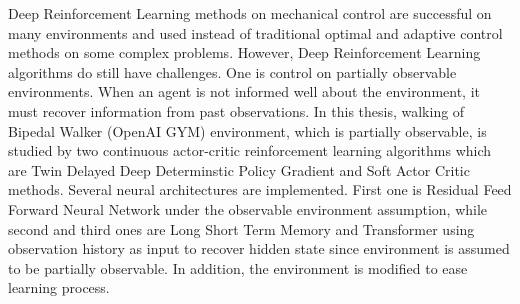 Deep Reinforcement Learning methods on mechanical control are successful on many environments and used instead of traditional optimal and adaptive control methods on some complex problems. 
However, Deep Reinforcement Learning algorithms do still have challenges. 
One is control on partially observable environments. 
When an agent is not informed well about the environment, it must recover information from past observations. 
In this thesis, walking of Bipedal Walker (OpenAI GYM) environment, 
which is partially observable, 
is studied by two continuous actor-critic reinforcement learning algorithms which are Twin Delayed Deep Determinstic Policy Gradient and Soft Actor Critic methods.
Several neural architectures are implemented. 
First one is Residual Feed Forward Neural Network under the observable environment assumption, 
while second and third ones are Long Short Term Memory and Transformer using observation history as input to recover hidden state since environment is assumed to be partially observable. 
In addition, the environment is modified to ease learning process. 
